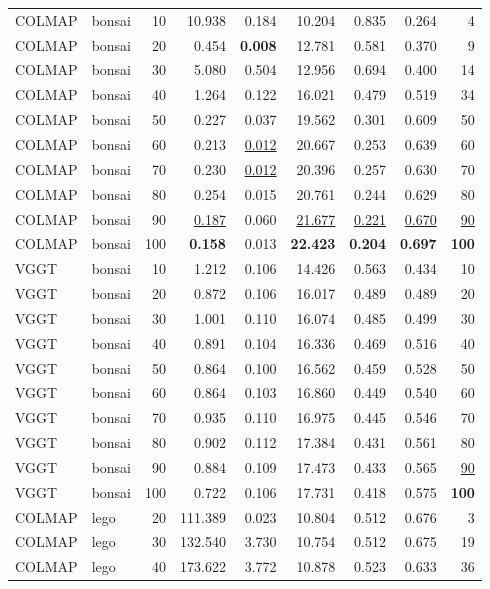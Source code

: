\begin{table}[H]
\begin{tabular}{llrrrrrrr}
\midrule
COLMAP & bonsai & 10 & 10.938 & 0.184 & 10.204 & 0.835 & 0.264 & 4 \\
COLMAP & bonsai & 20 & 0.454 & \textbf{0.008} & 12.781 & 0.581 & 0.370 & 9 \\
COLMAP & bonsai & 30 & 5.080 & 0.504 & 12.956 & 0.694 & 0.400 & 14 \\
COLMAP & bonsai & 40 & 1.264 & 0.122 & 16.021 & 0.479 & 0.519 & 34 \\
COLMAP & bonsai & 50 & 0.227 & 0.037 & 19.562 & 0.301 & 0.609 & 50 \\
COLMAP & bonsai & 60 & 0.213 & \underline{0.012} & 20.667 & 0.253 & 0.639 & 60 \\
COLMAP & bonsai & 70 & 0.230 & \underline{0.012} & 20.396 & 0.257 & 0.630 & 70 \\
COLMAP & bonsai & 80 & 0.254 & 0.015 & 20.761 & 0.244 & 0.629 & 80 \\
COLMAP & bonsai & 90 & \underline{0.187} & 0.060 & \underline{21.677} & \underline{0.221} & \underline{0.670} & \underline{90} \\
COLMAP & bonsai & 100 & \textbf{0.158} & 0.013 & \textbf{22.423} & \textbf{0.204} & \textbf{0.697} & \textbf{100} \\
VGGT & bonsai & 10 & 1.212 & 0.106 & 14.426 & 0.563 & 0.434 & 10 \\
VGGT & bonsai & 20 & 0.872 & 0.106 & 16.017 & 0.489 & 0.489 & 20 \\
VGGT & bonsai & 30 & 1.001 & 0.110 & 16.074 & 0.485 & 0.499 & 30 \\
VGGT & bonsai & 40 & 0.891 & 0.104 & 16.336 & 0.469 & 0.516 & 40 \\
VGGT & bonsai & 50 & 0.864 & 0.100 & 16.562 & 0.459 & 0.528 & 50 \\
VGGT & bonsai & 60 & 0.864 & 0.103 & 16.860 & 0.449 & 0.540 & 60 \\
VGGT & bonsai & 70 & 0.935 & 0.110 & 16.975 & 0.445 & 0.546 & 70 \\
VGGT & bonsai & 80 & 0.902 & 0.112 & 17.384 & 0.431 & 0.561 & 80 \\
VGGT & bonsai & 90 & 0.884 & 0.109 & 17.473 & 0.433 & 0.565 & \underline{90} \\
VGGT & bonsai & 100 & 0.722 & 0.106 & 17.731 & 0.418 & 0.575 & \textbf{100} \\
\midrule
COLMAP & lego & 20 & 111.389 & 0.023 & 10.804 & 0.512 & 0.676 & 3 \\
COLMAP & lego & 30 & 132.540 & 3.730 & 10.754 & 0.512 & 0.675 & 19 \\
COLMAP & lego & 40 & 173.622 & 3.772 & 10.878 & 0.523 & 0.633 & 36 \\

\end{tabular}
\end{table}
